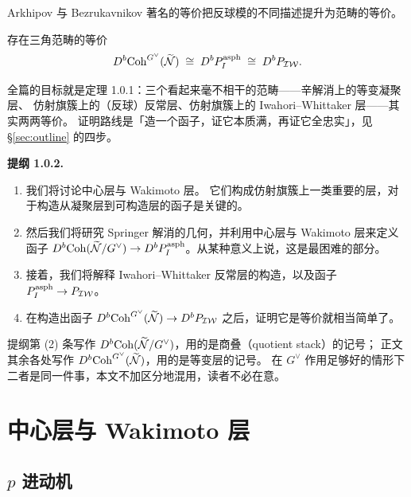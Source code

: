 Arkhipov 与 Bezrukavnikov 著名的等价把反球模的不同描述提升为范畴的等价。

\begin{theorem}
存在三角范畴的等价
\[
D^b\mathrm{Coh}^{G^\vee}(\widetilde{\mathcal{N}})\;\cong\;D^bP_I^{\mathrm{asph}}\;\cong\;D^bP_{\mathcal{IW}} .
\]
\end{theorem}

\begin{keytakeaways}
全篇的目标就是定理 1.0.1：三个看起来毫不相干的范畴——辛解消上的等变凝聚层、
仿射旗簇上的（反球）反常层、仿射旗簇上的 Iwahori–Whittaker 层——其实两两等价。
证明路线是「造一个函子，证它本质满，再证它全忠实」，见 \S\ref{sec:outline} 的四步。
\end{keytakeaways}

\noindent\textbf{提纲 1.0.2.}\label{sec:outline}
\begin{enumerate}[label=(\arabic*),leftmargin=2.2em,itemsep=2pt]
\item 我们将讨论中心层与 Wakimoto 层。
      它们构成仿射旗簇上一类重要的层，对于构造从凝聚层到可构造层的函子是关键的。
\item 然后我们将研究 Springer 解消的几何，并利用中心层与 Wakimoto 层来定义函子
      $D^b\mathrm{Coh}(\widetilde{\mathcal{N}}/G^\vee)\to D^bP_I^{\mathrm{asph}}$。从某种意义上说，这是最困难的部分。
\item 接着，我们将解释 Iwahori–Whittaker 反常层的构造，以及函子 $P_I^{\mathrm{asph}}\to P_{\mathcal{IW}}$。
\item 在构造出函子 $D^b\mathrm{Coh}^{G^\vee}(\widetilde{\mathcal{N}})\to D^bP_{\mathcal{IW}}$ 之后，证明它是等价就相当简单了。
\end{enumerate}

\begin{yizhu}
提纲第 (2) 条写作 $D^b\mathrm{Coh}(\widetilde{\mathcal{N}}/G^\vee)$，用的是商叠（quotient stack）的记号；
正文其余各处写作 $D^b\mathrm{Coh}^{G^\vee}(\widetilde{\mathcal{N}})$，用的是等变层的记号。
在 $G^\vee$ 作用足够好的情形下二者是同一件事，本文不加区分地混用，读者不必在意。
\end{yizhu}

\section{中心层与 Wakimoto 层}

\subsection{$p$ 进动机}\label{sec:padic}

